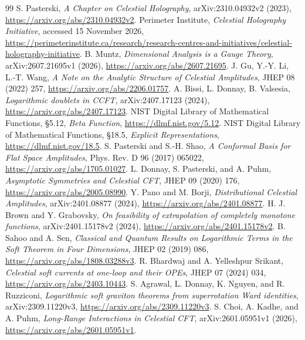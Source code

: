\documentclass[11pt]{article}
\theoremstyle{remark}\newtheorem{remark}[theorem]{Remark}
\begin{document}
\begin{thebibliography}{99}
 S. Pasterski, \emph{A Chapter on Celestial Holography}, arXiv:2310.04932v2 (2023), \url{https://arxiv.org/abs/2310.04932v2}.
 Perimeter Institute, \emph{Celestial Holography Initiative}, accessed 15 November 2026, \url{https://perimeterinstitute.ca/research/research-centres-and-initiatives/celestial-holography-initiative}.
 B. Muntz, \emph{Dimensional Analysis is a Gauge Theory}, arXiv:2607.21695v1 (2026), \url{https://arxiv.org/abs/2607.21695}.
 J. Gu, Y.-Y. Li, L.-T. Wang, \emph{A Note on the Analytic Structure of Celestial Amplitudes}, JHEP 08 (2022) 257, \url{https://arxiv.org/abs/2206.01757}.
 A. Bissi, L. Donnay, B. Valsesia, \emph{Logarithmic doublets in CCFT}, arXiv:2407.17123 (2024), \url{https://arxiv.org/abs/2407.17123}.
 NIST Digital Library of Mathematical Functions, \S5.12, \emph{Beta Function}, \url{https://dlmf.nist.gov/5.12}.
 NIST Digital Library of Mathematical Functions, \S18.5, \emph{Explicit Representations}, \url{https://dlmf.nist.gov/18.5}.
 S. Pasterski and S.-H. Shao, \emph{A Conformal Basis for Flat Space Amplitudes}, Phys. Rev. D 96 (2017) 065022, \url{https://arxiv.org/abs/1705.01027}.
 L. Donnay, S. Pasterski, and A. Puhm, \emph{Asymptotic Symmetries and Celestial CFT}, JHEP 09 (2020) 176, \url{https://arxiv.org/abs/2005.08990}.
 Y. Pano and M. Borji, \emph{Distributional Celestial Amplitudes}, arXiv:2401.08877 (2024), \url{https://arxiv.org/abs/2401.08877}.
 H. J. Brown and Y. Grabovsky, \emph{On feasibility of extrapolation of completely monotone functions}, arXiv:2401.15178v2 (2024), \url{https://arxiv.org/abs/2401.15178v2}.
 B. Sahoo and A. Sen, \emph{Classical and Quantum Results on Logarithmic Terms in the Soft Theorem in Four Dimensions}, JHEP 02 (2019) 086, \url{https://arxiv.org/abs/1808.03288v3}.
 R. Bhardwaj and A. Yelleshpur Srikant, \emph{Celestial soft currents at one-loop and their OPEs}, JHEP 07 (2024) 034, \url{https://arxiv.org/abs/2403.10443}.
 S. Agrawal, L. Donnay, K. Nguyen, and R. Ruzziconi, \emph{Logarithmic soft graviton theorems from superrotation Ward identities}, arXiv:2309.11220v3, \url{https://arxiv.org/abs/2309.11220v3}.
 S. Choi, A. Kadhe, and A. Puhm, \emph{Long-Range Interactions in Celestial CFT}, arXiv:2601.05951v1 (2026), \url{https://arxiv.org/abs/2601.05951v1}.

\end{thebibliography}
\end{document}
